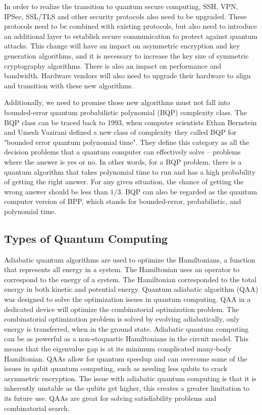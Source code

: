 \documentclass[sigconf]{acmart}
\begin{document}
In order to realize the transition to quantum secure computing, SSH, VPN, IPSec, SSL/TLS and other security protocols also need to be upgraded. These protocols need to be combined with existing protocols, but also need to introduce an additional layer to establish secure communication to protect against quantum attacks. This change will have an impact on asymmetric encryption and key generation algorithms, and it is necessary to increase the key size of symmetric cryptography algorithms. There is also an impact on performance and bandwidth. Hardware vendors will also need to upgrade their hardware to align and transition with these new algorithms.

Additionally, we need to promise those new algorithms must not fall into bounded-error quantum probabilistic polynomial (BQP) complexity class. The BQP class can be traced back to 1993, when computer scientists Ethan Bernstein and Umesh Vazirani defined a new class of complexity they called BQP for "bounded error quantum polynomial time"\cite{bernstein_quantum_1997}. They define this category as all the decision problems that a quantum computer can effectively solve -- problems where the answer is yes or no. In other words, for a BQP problem, there is a quantum algorithm that takes polynomial time to run and has a high probability of getting the right answer. For any given situation, the chance of getting the wrong answer should be less than $1/3$. BQP can also be regarded as the quantum computer version of BPP, which stands for bounded-error, probabilistic, and polynomial time\cite{younes_bounded-error_2015}. 

\subsection{Types of Quantum Computing}
Adiabatic quantum algorithms are used to optimize the Hamiltonians, a function that represents all energy in a system. The Hamiltonian uses an operator to correspond to the energy of a system. The Hamiltonian corresponded to the total energy in both kinetic and potential energy. Quantum adiabatic algorithm (QAA) was designed to solve the optimization issues in quantum computing. QAA in a dedicated device will optimize the combinatorial optimization problem. The combinatorial optimization problem is solved by evolving adiabatically, only energy is transferred, when in the ground state. Adiabatic quantum computing can be as powerful as a non-stoquastic Hamiltonians in the circuit model. This means that the eigenvalue gap is at its minimum complicated many-body Hamiltonian. QAAs allow for quantum speedup and can overcome some of the issues in qubit quantum computing, such as needing less qubits to crack asymmetric encryption. The issue with adiabatic quantum computing is that it is inherently unstable as the qubits get higher, this creates a greater limitation to its future use. QAAs are great for solving satisfiability problems and combinatorial search\cite{albash_adiabatic_2016}.
\end{document}
